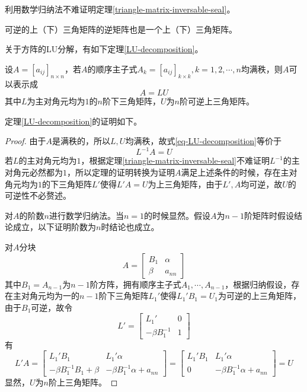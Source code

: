 利用数学归纳法不难证明定理\ref{triangle-matrix-inversable-seal}。

\begin{thm}
    \label{triangle-matrix-inversable-seal}
    可逆的上（下）三角矩阵的逆矩阵也是一个上（下）三角矩阵。
\end{thm}

关于方阵的LU分解，有如下定理\ref{LU-decomposition}。

\begin{thm}
    \label{LU-decomposition}
    设$A=[a_{ij}]_{n\times n}$，若$A$的顺序主子式$A_k=[a_{ij}]_{k\times k},k=1,2,\cdots,n$均满秩，则$A$可以表示成
    \begin{equation}
        A=LU\label{eq-LU-decomposition}
    \end{equation}
    其中$L$为主对角元均为$1$的$n$阶下三角矩阵，$U$为$n$阶可逆上三角矩阵。
\end{thm}

定理\ref{LU-decomposition}的证明如下。

\begin{proof}
    \label{proof-LU-decomposition}
    由于$A$是满秩的，所以$L,U$均满秩，故式\ref{eq-LU-decomposition}等价于
    \[
        L^{-1}A=U
    \]
    若$L$的主对角元均为$1$，根据定理\ref{triangle-matrix-inversable-seal}不难证明$L^{-1}$的主对角元必然都为$1$，所以定理的证明转换为证明$A$满足上述条件的时候，存在主对角元均为$1$的下三角矩阵$L'$使得$L'A=U$为上三角矩阵，由于$L',A$均可逆，故$U$的可逆性不必赘述。

    对$A$的阶数$n$进行数学归纳法。当$n=1$的时候显然。假设$A$为$n-1$阶矩阵时假设结论成立，以下证明阶数为$n$时结论也成立。

    对$A$分块
    \[
        A=\begin{bmatrix}
            B_1 & \alpha \\ \beta & a_{nn}
        \end{bmatrix}
    \]
    其中$B_1=A_{n-1}$为$n-1$阶方阵，拥有顺序主子式$A_1,\cdots,A_{n-1}$，根据归纳假设，存在主对角元均为一的$n-1$阶下三角矩阵$L_1'$使得$L_1'B_1=U_1$为可逆的上三角矩阵，由于$B_1$可逆，故令
    \[
        L'=\begin{bmatrix}
            L_1' & 0 \\ -\beta B_1^{-1} & 1
        \end{bmatrix}
    \]
    有
    \[
        L'A=\begin{bmatrix}
            L_1'B_1 & L_1'\alpha \\
            -\beta B_1^{-1}B_1+\beta & -\beta B_1^{-1}\alpha+a_{nn}
        \end{bmatrix}=\begin{bmatrix}
            L_1'B_1 & L_1'\alpha \\
            0 & -\beta B_1^{-1}\alpha+a_{nn}
        \end{bmatrix}=U
    \]
    显然，$U$为$n$阶上三角矩阵。
\end{proof}
